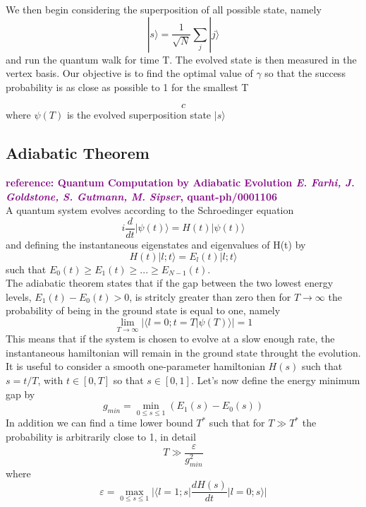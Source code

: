 \documentclass[aps,pra,reprint, onecolumn, showkeys]{revtex4-2}
\newcommand{\purple}[1]{\textcolor{purple}{\textbf{reference: #1}}}
\begin{document}
We then begin considering the superposition of all possible state, namely
\begin{equation}
  |s\rangle = \frac{1}{\sqrt{N}}\sum_j|j\rangle
\end{equation}
and run the quantum walk for time T. The evolved state is then measured in the vertex basis. Our objective is to find the optimal value of $\gamma$ so that the success probability is as close as possible to 1 for the smallest T

\begin{equation}
 c
\end{equation}
where $\psi(T)$ is the evolved superposition state $|s\rangle$


\subsection{Adiabatic Theorem}
\purple{Quantum Computation by Adiabatic Evolution \textit{E. Farhi, J. Goldstone, S. Gutmann, M. Sipser}, quant-ph/0001106 }\\


A quantum system evolves according to the Schroedinger equation
\begin{equation}
	i\frac{d}{dt}|\psi(t)\rangle = H(t)|\psi(t)\rangle
\end{equation}
and defining the instantaneous eigenstates and eigenvalues of H(t) by
\begin{equation}
	H(t)|l;t\rangle = E_l(t)|l;t\rangle
\end{equation}
such that $E_0(t) \geq E_1(t) \geq ... \geq E_{N-1}(t)$. \\
The adiabatic theorem states that if the gap between the two lowest energy levels, $E_{1}(t) - E_{0}(t) > 0$, is stritcly greater than zero then for $T\rightarrow \infty$ the probability of being in the ground state is equal to one, namely
\begin{equation}
	\lim_{T \to \infty} |\langle l=0;t = T | \psi(T)\rangle| = 1
\end{equation}
This means that if the system is chosen to evolve at a slow enough rate, the instantaneous hamiltonian will remain in the ground state throught the evolution. It is useful to consider a smooth one-parameter hamiltonian $H(s)$ such that $s=t/T$, with $t \in [0,T]$ so that $s \in [0,1]$.
Let's now define the energy minimum gap by
\begin{equation}
	g_{min} = \min_{0 \leq s \leq 1} (E_1(s)-E_0(s))
\end{equation}
In addition we can find a time lower bound $T^*$ such that for $T\gg T^{*}$ the probability is arbitrarily close to 1, in detail
\begin{equation}
	T \gg \frac{\varepsilon}{g^{2}_{min}}
\end{equation}
where
\begin{equation}
	\varepsilon = \max_{0 \leq s \leq 1} \Big| \Big\langle l=1;s\Big| \frac{dH(s)}{dt} \Big| l=0;s\Big\rangle\Big|
\end{equation}
\end{document}
